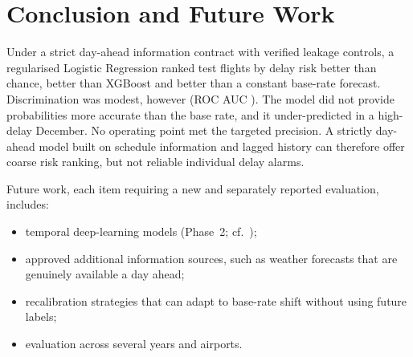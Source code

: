 \documentclass[conference]{IEEEtran}
\begin{document}
\section{Conclusion and Future Work}\label{sec:conclusion}
Under a strict day-ahead information contract with verified leakage controls, a regularised
Logistic Regression ranked test flights by delay risk better than chance, better than XGBoost and
better than a constant base-rate forecast. Discrimination was modest, however (ROC AUC
\TestROCLR{}). The model did not provide probabilities more accurate than the base rate, and it
under-predicted in a high-delay December. No operating point met the targeted \MinPrecision{}
precision. A strictly day-ahead model built on schedule information and lagged history can
therefore offer coarse risk ranking, but not reliable individual delay alarms.

Future work, each item requiring a new and separately reported evaluation, includes:
\begin{itemize}
\item temporal deep-learning models (Phase~2; cf.~\cite{kim2016});
\item approved additional information sources, such as weather forecasts that are genuinely
available a day ahead;
\item recalibration strategies that can adapt to base-rate shift without using future labels;
\item evaluation across several years and airports.
\end{itemize}



\end{document}
